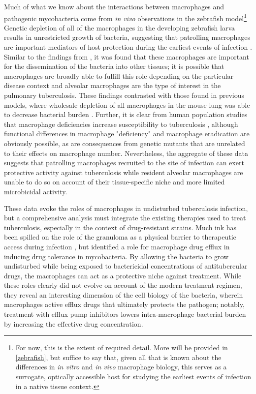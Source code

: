 Much of what we know about the interactions between macrophages and pathogenic mycobacteria come from \textit{in vivo} observations in the zebrafish model\footnote{For now, this is the extent of required detail. More will be provided in \autoref{zebrafish}, but suffice to say that, given all that is known about the differences in \textit{in vitro} and \textit{in vivo} macrophage biology, this serves as a surrogate, optically accessible host for studying the earliest events of infection in a native tissue context.} Genetic depletion of all of the macrophages in the developing zebrafish larva results in unrestricted growth of bacteria, suggesting that patrolling macrophages are important mediators of host protection during the earliest events of infection \citep{Clay2007}. Similar to the findings from \citeauthor{Cohen2018}, it was found that these macrophages are important for the dissemination of the bacteria into other tissues; it is possible that macrophages are broadly able to fulfill this role depending on the particular disease context and alveolar macrophages are the type of interest in the pulmonary tuberculosis. These findings contrasted with those found in previous models, where wholesale depletion of all macrophages in the mouse lung was able to decrease bacterial burden \citep{Leemans2005}. Further, it is clear from human population studies that macrophage deficiencies increase susceptibility to tuberculosis \citep{Hambleton2011}, although functional differences in macrophage "deficiency" and macrophage eradication are obviously possible, as are consequences from genetic mutants that are unrelated to their effects on macrophage number. Nevertheless, the aggregate of these data suggests that patrolling macrophages recruited to the site of infection can exert protective activity against tuberculosis while resident alveolar macrophages are unable to do so on account of their tissue-specific niche and more limited microbicidal activity.

These data evoke the roles of macrophages in undisturbed tuberculosis infection, but a comprehensive analysis must integrate the existing therapies used to treat tuberculosis, especially in the context of drug-resistant strains. Much ink has been spilled on the role of the granuloma as a physical barrier to therapeutic access during infection \citep{}, but \citeauthor{Adams2011} identified a role for macrophage drug efflux in inducing drug tolerance in mycobacteria. By allowing the bacteria to grow undisturbed while being exposed to bactericidal concentrations of antitubercular drugs, the macrophages can act as a protective niche against treatment. While these roles clearly did not evolve on account of the modern treatment regimen, they reveal an interesting dimension of the cell biology of the bacteria, wherein macrophages active efflux drugs that ultimately protects the pathogen; notably, treatment with efflux pump inhibitors lowers intra-macrophage bacterial burden by increasing the effective drug concentration.

